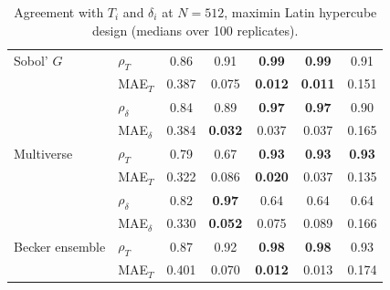 \documentclass[11pt,a4paper]{article}
\begin{document}
\begin{table}[H]
\begin{tabular}{@{}llccccc@{}}
\addlinespace[2pt]
Sobol' $G$ & $\rho_T$ & 0.86 & 0.91 & \textbf{0.99} & \textbf{0.99} & 0.91 \\
 & MAE$_T$ & 0.387 & 0.075 & \textbf{0.012} & \textbf{0.011} & 0.151 \\
 & $\rho_\delta$ & 0.84 & 0.89 & \textbf{0.97} & \textbf{0.97} & 0.90 \\
 & MAE$_\delta$ & 0.384 & \textbf{0.032} & 0.037 & 0.037 & 0.165 \\
\addlinespace[2pt]
Multiverse & $\rho_T$ & 0.79 & 0.67 & \textbf{0.93} & \textbf{0.93} & \textbf{0.93} \\
 & MAE$_T$ & 0.322 & 0.086 & \textbf{0.020} & 0.037 & 0.135 \\
 & $\rho_\delta$ & 0.82 & \textbf{0.97} & 0.64 & 0.64 & 0.64 \\
 & MAE$_\delta$ & 0.330 & \textbf{0.052} & 0.075 & 0.089 & 0.166 \\
\addlinespace[2pt]
Becker ensemble & $\rho_T$ & 0.87 & 0.92 & \textbf{0.98} & \textbf{0.98} & 0.93 \\
 & MAE$_T$ & 0.401 & 0.070 & \textbf{0.012} & 0.013 & 0.174 \\
\bottomrule\end{tabular}
\caption{Agreement with $T_i$ and $\delta_i$ at $N=512$, maximin Latin hypercube design (medians over 100 replicates).}
\label{tab:agree_lhs}
\end{table}
\end{document}
